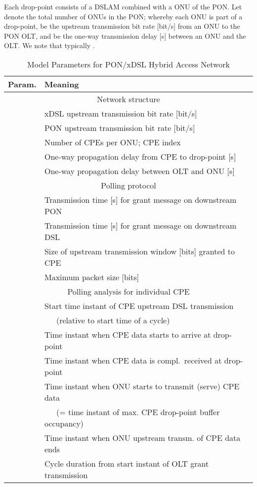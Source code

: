 \documentclass[pdftex,journal]{IEEEtran}
\begin{document}
Each drop-point consists of a DSLAM combined with a ONU of the
PON. Let  denote the total number of ONUs in the PON; whereby each ONU
is part of a drop-point,  be the upstream transmission bit rate [bit/s]
from an ONU to the PON OLT, and  be the one-way transmission
delay [s] between an ONU and the OLT. We note that typically .
\begin{table}[t]
\caption{Model Parameters for PON/xDSL Hybrid Access Network}
\label{tab:params}
\centering
\begin{tabular}{|l|l|}
\hline
Param. & Meaning \\ [0.5ex]
\hline
\multicolumn{2}{|c|}{Network structure} \\
 &   xDSL upstream transmission bit rate [bit/s] \\
 &   PON upstream transmission bit rate [bit/s]\\
 &  Number of CPEs per ONU; CPE index \\
  &   One-way propagation delay from CPE  to drop-point [s] \\
   &   One-way propagation delay between OLT and ONU [s]\\ \hline
\multicolumn{2}{|c|}{Polling protocol} \\
  &    Transmission time [s] for grant message on downstream PON\\
   &   Transmission time [s] for grant message on downstream DSL \\
   &   Size of upstream transmission window [bits] granted to
            CPE  \\
 &   Maximum packet size [bits] \\  \hline
\multicolumn{2}{|c|}{Polling analysis for individual CPE } \\
  & Start time instant of CPE  upstream DSL transmission \\
 & \ \ \    (relative to start time of a cycle) \\
 & Time instant when CPE  data
            starts to arrive at drop-point \\
 & Time instant when CPE  data is compl.\ received
    at drop-point \\
  & Time instant when ONU starts to transmit (serve) CPE 
       data \\
   & \ \ \ (= time instant of max. CPE  drop-point buffer occupancy) \\
 &  Time instant when ONU upstream transm. of CPE  data
         ends \\
 & Cycle duration from start instant of OLT grant transmission \\

\end{tabular}
\end{table}
\end{document}
